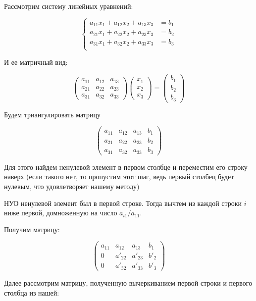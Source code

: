 \documentclass[12pt]{article}
\begin{document}
Рассмотрим систему линейных уравнений:

\[
    \left\{
    \begin{aligned}
    a_{11}x_1 + a_{12}x_2 + a_{13}x_3 &= b_1 \\
    a_{21}x_1 + a_{22}x_2 + a_{23}x_3 &= b_2 \\
    a_{31}x_1 + a_{32}x_2 + a_{33}x_3 &= b_3 \\
    \end{aligned}
    \right.
\]

И ее матричный вид:

\[
\begin{pmatrix}
a_{11} & a_{12} & a_{13} \\
a_{21} & a_{22} & a_{23} \\
a_{31} & a_{32} & a_{33}
\end{pmatrix}
\begin{pmatrix}
x_1 \\
x_2 \\
x_3
\end{pmatrix}
=
\begin{pmatrix}
b_1 \\
b_2 \\
b_3
\end{pmatrix}
\]

Будем триангулировать матрицу

\[
\begin{pmatrix}
a_{11} & a_{12} & a_{13} & b_1 \\
a_{21} & a_{22} & a_{23} & b_2 \\
a_{31} & a_{32} & a_{33} & b_3
\end{pmatrix}
\]

Для этого найдем ненулевой элемент в первом столбце и переместим его строку наверх (если такого нет, то пропустим этот шаг, ведь первый столбец будет нулевым, что удовлетворяет нашему методу)

НУО ненулевой элемент был в первой строке. Тогда вычтем из каждой строки $i$ ниже первой, домноженную на число $a_{i1}/a_{11}$.

Получим матрицу:

\[
\begin{pmatrix}
a_{11} & a_{12} & a_{13} & b_1 \\
0 & a'_{22} & a'_{23} & b'_2 \\
0 & a'_{32} & a'_{33} & b'_3
\end{pmatrix}
\]

Далее рассмотрим матрицу, полученную вычеркиванием первой строки и первого столбца из нашей:
\end{document}
